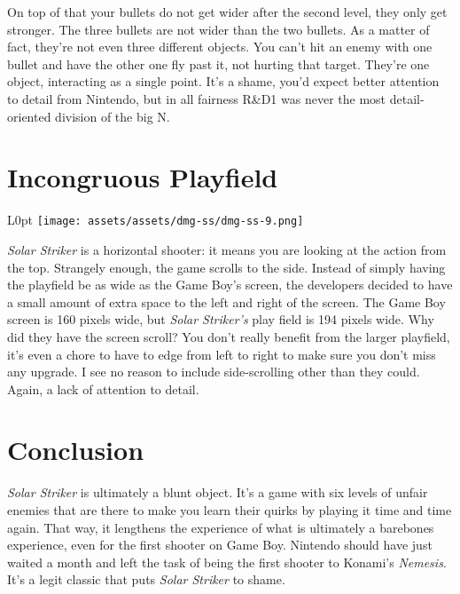 \documentclass{book}
\let\oldcenter\center
\let\oldendcenter\endcenter
\renewenvironment{center}{\setlength\topsep{0pt}\oldcenter}{\oldendcenter}
\begin{document}
\begin{center}
\vspace{8pt}
\quad\vspace{4pt}
\end{center}

On top of that your bullets do not get wider after the second level, they only get stronger. The three bullets are not wider than the two bullets. As a matter of fact, they’re not even three different objects. You can’t hit an enemy with one bullet and have the other one fly past it, not hurting that target. They’re one object, interacting as a single point. It’s a shame, you’d expect better attention to detail from Nintendo, but in all fairness R\&D1 was never the most detail-oriented division of the big N.

\FloatBarrier\needspace{5pt}\section*{Incongruous Playfield}\nopagebreak[4]

\begin{wrapfigure}{L}{0pt} \texttt{[image: assets/assets/dmg-ss/dmg-ss-9.png]}\end{wrapfigure}
\emph{Solar Striker} is a horizontal shooter: it means you are looking at the action from the top. Strangely enough, the game scrolls to the side. Instead of simply having the playfield be as wide as the Game Boy’s screen, the developers decided to have a small amount of extra space to the left and right of the screen. The Game Boy screen is 160 pixels wide, but \emph{Solar Striker’s} play field is 194 pixels wide. Why did they have the screen scroll? You don’t really benefit from the larger playfield, it’s even a chore to have to edge from left to right to make sure you don’t miss any upgrade. I see no reason to include side-scrolling other than they could. Again, a lack of attention to detail.

\FloatBarrier\needspace{5pt}\section*{Conclusion}\nopagebreak[4]

\emph{Solar Striker} is ultimately a blunt object. It’s a game with six levels of unfair enemies that are there to make you learn their quirks by playing it time and time again. That way, it lengthens the experience of what is ultimately a barebones experience, even for the first shooter on Game Boy. Nintendo should have just waited a month and left the task of being the first shooter to Konami’s \emph{Nemesis}. It’s a legit classic that puts \emph{Solar Striker} to shame.
\end{document}
